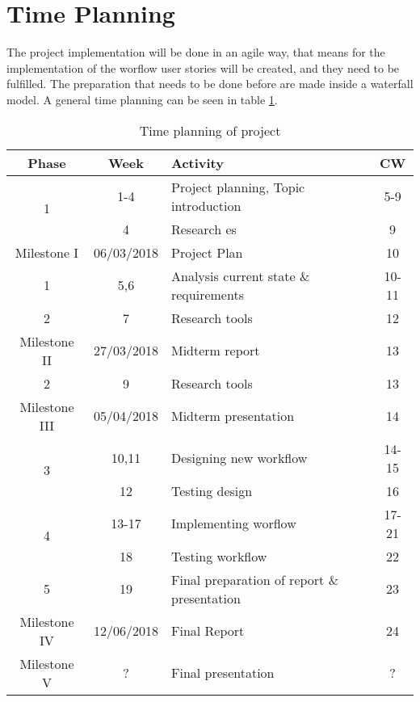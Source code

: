 \section{Time Planning}
The project implementation will be done in an agile way, that means for the implementation of the worflow user stories will be created, and they need to be fulfilled. The preparation that needs to be done before are made inside a waterfall model. A general time planning can be seen in table \ref{tab:timeplanning}. 
\begin{table} [h]
	\centering
	\begin{tabular}{|c|c|l|c|} \hline
		\rowcolor{Gray}Phase & Week & Activity & CW \\ \hline
		\multirow{2}{*}{1} & 1-4 & Project planning, Topic introduction & 5-9 \\
		& 4 & Research \gls{es} & 9 \\	\hline	
		Milestone I & 06/03/2018 & Project Plan & 10\\ \hline
		1 & 5,6 & Analysis current state \& requirements & 10-11  \\ \hline
		2 & 7 & Research tools & 12 \\ \hline
		Milestone II & 27/03/2018 & Midterm report & 13\\ \hline
		2 & 9 & Research tools & 13 \\ \hline
		Milestone III & 05/04/2018 & Midterm presentation & 14 \\ \hline
		\multirow{2}{*}{3} & 10,11 & Designing new workflow & 14-15 \\
		& 12 & Testing design & 16 \\ \hline
		\multirow{2}{*}{4} & 13-17 & Implementing worflow & 17-21 \\
		& 18 & Testing workflow & 22 \\ \hline
		5 & 19 & Final preparation of report \& presentation & 23 \\ \hline
		Milestone IV & 12/06/2018 & Final Report & 24\\ \hline
		Milestone V & ? & Final presentation & ? \\ \hline
	\end{tabular}
	\caption{Time planning of project}
	\label{tab:timeplanning}
\end{table}

